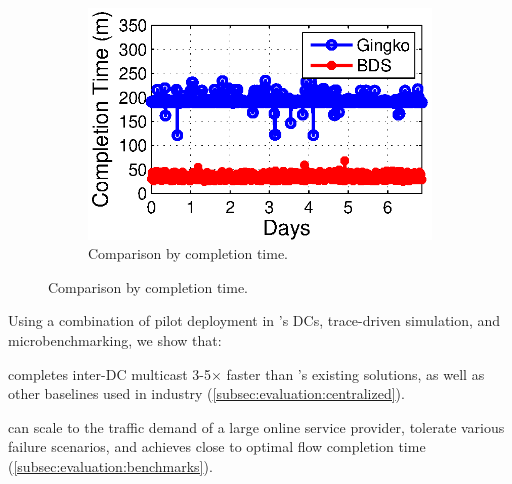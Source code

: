 \begin{figure}[t]
\begin{subfigure}[b]{0.3\textwidth}
                \label{fig:BDSvsAnon:FCT}
        \end{subfigure}
        \begin{subfigure}[b]{0.3\textwidth}
                \centering
                \includegraphics[width=\textwidth]{images/BDSvsAnon_time_v2.eps}
                \caption{Comparison by completion time.}
                \label{fig:BDSvsAnon:time}
        \end{subfigure}
        \label{fig:BDSvsAnon}
\vspace{-0.4cm}
\end{figure}

Using a combination of pilot deployment in \company's DCs,
trace-driven simulation, and microbenchmarking, we show that:
\begin{packedenumerate}
\item \name completes inter-DC multicast 3-5$\times$ faster than
\company's existing solutions, as well as other baselines used in
industry (\Section\ref{subsec:evaluation:centralized}).


\item \name can scale to the traffic demand of a large online
service provider, tolerate various failure scenarios, and achieves
close to optimal flow completion time
(\Section\ref{subsec:evaluation:benchmarks}).


\end{packedenumerate}

